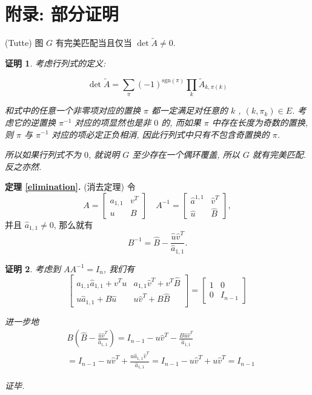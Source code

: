 \documentclass[a4paper]{article}
\newtheorem*{Proof}{\hspace{2em}证明}
\begin{document}
	\section{附录: 部分证明}

		 (Tutte) 
			图 $G$ 有完美匹配当且仅当 $\det \tilde A \neq 0$.

		\begin{Proof}
			考虑行列式的定义:

			$$ \det \tilde A = \sum_{\pi} (-1)^{\mathrm{sgn}(\pi)} \prod_{k} \tilde A _{k, \pi(k)} $$

			和式中的任意一个非零项对应的置换 $\pi$ 都一定满足对任意的 $k$ , $(k, \pi_k) \in E$. 考虑它的逆置换 $\pi^{-1}$ 对应的项显然也是非 $0$ 的, 而如果 $\pi$ 中存在长度为奇数的置换, 则 $\pi$ 与 $\pi^{-1}$ 对应的项必定正负相消, 因此行列式中只有不包含奇置换的 $\pi$.

			所以如果行列式不为 $0$, 就说明 $G$ 至少存在一个偶环覆盖, 所以 $G$ 就有完美匹配. 反之亦然.
		\end{Proof}

		{\bfseries 定理 \ref{elimination}.} (消去定理)
			令
			$$ A = \begin{bmatrix}
				a_{1, 1} & v^T \\
				u & B
			\end{bmatrix} \quad A^{-1} = \begin{bmatrix}
				\hat a^{1, 1} & \hat v^T \\
				\hat u & \hat B
			\end{bmatrix} , $$
			并且 $\hat a_{1, 1} \ne 0$, 那么就有
			$$ B^{-1} = \hat B - \frac {\hat u \hat v^T} {\hat a_{1, 1}}. $$
		
		\begin{Proof}
			考虑到 $A A^{-1} = I_n$, 我们有
			$$ \begin{bmatrix}
				a_{1, 1} \hat a_{1, 1} + v^T u & a_{1, 1} \hat v^T + v^T \hat B \\
				u \hat a_{1, 1} + B \hat u & u \hat v^T + B \hat B
			\end{bmatrix} = \begin{bmatrix}
				1 & 0 \\ 0 & I_{n - 1}
			\end{bmatrix} $$

			进一步地
			$$ \begin{aligned} & B(\hat B - \frac {\hat u \hat v^T} {\hat a_{1, 1}}) = I_{n - 1} - u \hat v^{T} - \frac {B \hat u \hat v^T} {\hat a_{1, 1}} \\
			& = I_{n - 1} - u \hat v^T + \frac {u \hat a_{1, 1} \hat v^T} {\hat a_{1, 1}} = I_{n - 1} - u \hat v^T + u \hat v^T = I_{n - 1} \end{aligned} $$

			证毕.
		\end{Proof}
\end{document}
